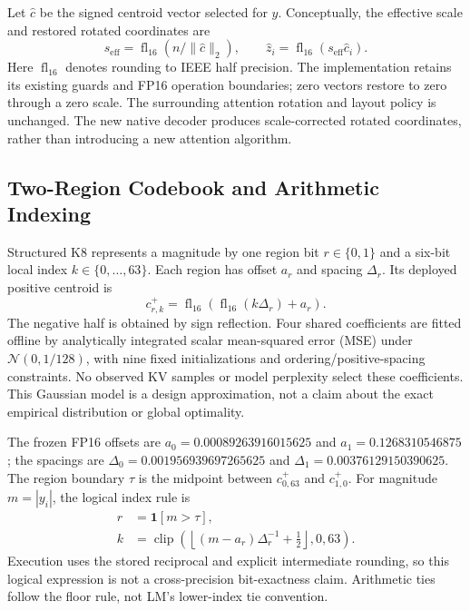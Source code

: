 \documentclass[conference,a4paper,10pt]{IEEEtran}
\newcommand{\fl}{\operatorname{fl}_{16}}
\newcommand{\clip}{\operatorname{clip}}
\begin{document}
Let $\hat c$ be the signed centroid vector selected for $y$. Conceptually, the effective scale and restored rotated coordinates are
\begin{equation}
 s_{\mathrm{eff}}=\fl\!\left(n/\lVert\hat c\rVert_2\right),
 \qquad \hat z_i=\fl(s_{\mathrm{eff}}\hat c_i).
 \label{eq:scale}
\end{equation}
Here $\fl$ denotes rounding to IEEE half precision. The implementation retains its existing guards and FP16 operation boundaries; zero vectors restore to zero through a zero scale. The surrounding attention rotation and layout policy is unchanged. The new native decoder produces scale-corrected rotated coordinates, rather than introducing a new attention algorithm.

\subsection{Two-Region Codebook and Arithmetic Indexing}
Structured K8 represents a magnitude by one region bit $r\in\{0,1\}$ and a six-bit local index $k\in\{0,\ldots,63\}$. Each region has offset $a_r$ and spacing $\Delta_r$. Its deployed positive centroid is
\begin{equation}
 c^+_{r,k}=\fl\!\left(\fl(k\Delta_r)+a_r\right).
 \label{eq:centroid}
\end{equation}
The negative half is obtained by sign reflection. Four shared coefficients are fitted offline by analytically integrated scalar mean-squared error (MSE) under $\mathcal{N}(0,1/128)$, with nine fixed initializations and ordering/positive-spacing constraints. No observed KV samples or model perplexity select these coefficients. This Gaussian model is a design approximation, not a claim about the exact empirical distribution or global optimality.

The frozen FP16 offsets are $a_0=0.00089263916015625$ and $a_1=0.1268310546875$; the spacings are $\Delta_0=0.001956939697265625$ and $\Delta_1=0.00376129150390625$. The region boundary $\tau$ is the midpoint between $c^+_{0,63}$ and $c^+_{1,0}$. For magnitude $m=|y_i|$, the logical index rule is
\begin{align}
 r &= \mathbf{1}[m>\tau], \nonumber\\
 k &= \clip\!\left(\left\lfloor (m-a_r)\Delta_r^{-1}+\tfrac12\right\rfloor,0,63\right).
 \label{eq:index}
\end{align}
Execution uses the stored reciprocal and explicit intermediate rounding, so this logical expression is not a cross-precision bit-exactness claim. Arithmetic ties follow the floor rule, not LM's lower-index tie convention.
\end{document}

